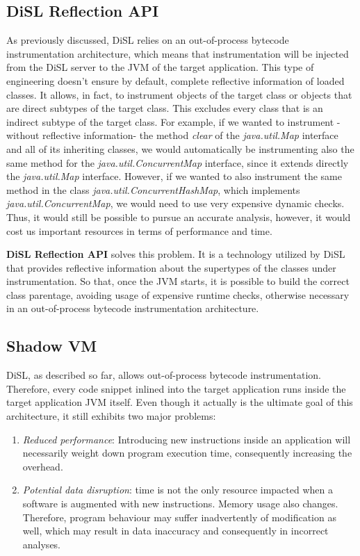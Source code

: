 \documentclass[]{usiinfthesis}
\begin{document}
\subsection{DiSL Reflection API}
As previously discussed, DiSL relies on an out-of-process bytecode instrumentation architecture, which means that instrumentation will be injected from the DiSL server to the JVM of the target application. This type of engineering doesn't ensure by default, complete reflective information of loaded classes. It allows, in fact, to instrument objects of the target class or objects that are direct subtypes of the target class. This excludes every class that is an indirect subtype of the target class. For example, if we wanted to instrument -without reflective information- the method \textit{clear} of the \textit{java.util.Map} interface and all of its inheriting classes, we would automatically be instrumenting also the same method for the \textit{java.util.ConcurrentMap} interface, since it extends directly the \textit{java.util.Map} interface. However, if we wanted to also instrument the same method in the class \textit{java.util.ConcurrentHashMap}, which implements \textit{java.util.ConcurrentMap}, we would need to use very expensive dynamic checks. Thus, it would still be possible to pursue an accurate analysis, however, it would cost us important resources in terms of performance and time.

\textbf{DiSL Reflection API} solves this problem. It is a technology utilized by DiSL that provides reflective information about the supertypes of the classes under instrumentation. So that, once the JVM starts, it is possible to build the correct class parentage, avoiding usage of expensive runtime checks, otherwise necessary in an out-of-process bytecode instrumentation architecture.

\subsection{Shadow VM}

DiSL, as described so far, allows out-of-process bytecode instrumentation. Therefore, every code snippet inlined into the target application runs inside the target application JVM itself. Even though it actually is the ultimate goal of this architecture, it still exhibits two major problems:
\begin{enumerate}
    \item \textit{Reduced performance}: Introducing new instructions inside an application will necessarily weight down program execution time, consequently increasing the overhead.
    \item \textit{Potential data disruption}: time is not the only resource impacted when a software is augmented with new instructions. Memory usage also changes. Therefore, program behaviour may suffer inadvertently of modification as well, which may result in data inaccuracy and consequently in incorrect analyses.
\end{enumerate}
\end{document}
